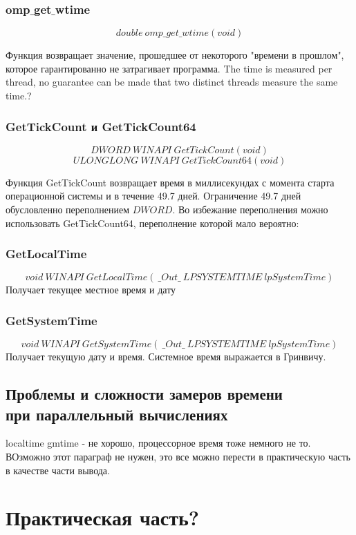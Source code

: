 \documentclass{article}
\begin{document}
			\subsubsection*{omp$\_$get$\_$wtime}
			$$double~omp\_get\_wtime(void)$$
				
				Функция возвращает значение, прошедшее от некоторого "времени в прошлом", которое гарантированно не затрагивает 				программа.  The time is measured per thread, no guarantee can be made that two distinct threads measure the same 					time.?
			\subsubsection*{GetTickCount и GetTickCount64}
				$$DWORD~WINAPI~GetTickCount(void)$$
				$$ULONGLONG~WINAPI~GetTickCount64(void)$$
				
					Функция GetTickCount возвращает время в миллисекундах с момента старта операционной системы и в течение 49.7 					дней. Ограничение 49.7 дней обусловленно переполнением $DWORD$. Во избежание переполнения можно использовать 						GetTickCount64, переполнение которой мало вероятно:			
			\subsubsection*{GetLocalTime}
			$$void~WINAPI~GetLocalTime(~\_Out\_~LPSYSTEMTIME~lpSystemTime)$$
			Получает текущее местное время и дату 
			\subsubsection*{GetSystemTime}
			$$void~WINAPI~GetSystemTime(~\_Out\_~LPSYSTEMTIME~lpSystemTime)$$
			Получает текущую дату и время. Системное время выражается в Гринвичу.			
		\newpage
		\subsection{Проблемы и сложности замеров времени \\ при параллельный вычислениях}
			localtime gmtime - не хорошо, процессорное время тоже немного не то. ВОзможно этот параграф не нужен, это все можно 			перести в практическую часть в качестве части вывода.
	\newpage
	\section{Практическая часть?}
\end{document}
